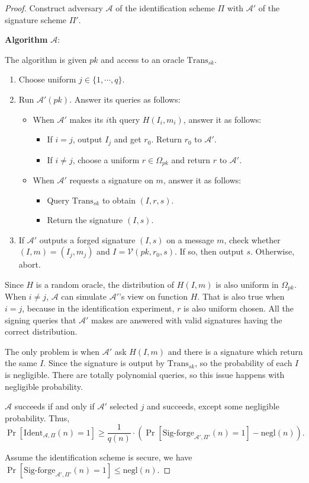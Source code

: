 \documentclass[a4paper]{article}
\newcommand{\negl}{\text{negl}}
\newcommand{\Trans}{\text{Trans}}
\newcommand{\V}{\mathcal{V}}
\newcommand{\A}{\mathcal{A}}
\newenvironment{problem}[2][Problem]{\begin{trivlist}
\item[\hskip \labelsep {\bfseries #1}\hskip \labelsep {\bfseries #2.}]}{\end{trivlist}}
\begin{document}
\begin{problem}{12.6}
\begin{proof}
Construct adversary $\A$ of the identification scheme $\Pi$ with $\A'$ of the signature scheme $\Pi'$.\par
\textbf{Algorithm} $\A$:\par
The algorithm is given $pk$ and access to an oracle $\Trans_{sk}$.
\begin{enumerate}
    \item Choose uniform $j\in\{1,\cdots,q\}$.
    \item Run $\A'(pk)$. Answer its queries as follows:
    \begin{itemize}
        \item When $\A'$ makes its $i$th query $H(I_i,m_i)$, answer it as follows:
        \begin{itemize}
            \item If $i = j$, output $I_j$ and get $r_0$. Return $r_0$ to $\A'$.
            \item If $i \ne j$, choose a uniform $r\in\Omega_{pk}$ and return $r$ to $\A'$.
        \end{itemize}
        \item When $\A'$ requests a signature on $m$, answer it as follows: \par
        \begin{itemize}
            \item Query $\Trans_{sk}$ to obtain $(I,r,s)$.
            \item Return the signature $(I,s)$.
        \end{itemize}
    \end{itemize}   
    \item If $\A'$ outputs a forged signature $(I,s)$ on a message $m$, check whether $(I,m)=(I_j,m_j)$ and $I=\V(pk,r_0,s)$. If so, then output $s$. Otherwise, abort. 
\end{enumerate}\par
Since $H$ is a random oracle, the distribution of $H(I,m)$ is also uniform in $\Omega_{pk}$. When $i\ne j$, $\A$ can simulate $\A'$'s view on function $H$. That is also true when $i=j$, because in the identification experiment, $r$ is also uniform chosen. All the signing queries that $\A'$ makes are answered with valid signatures having the correct distribution.\par
The only problem is when $\A'$ ask $H(I,m)$ and there is a signature which return the same $I$. Since the signature is output by $\Trans_{sk}$, so the probability of each $I$ is negligible. There are totally polynomial queries, so this issue happens with negligible probability.\par
$\A$ succeeds if and only if $\A'$ selected $j$ and succeeds, except some negligible probability. Thus,
$$\Pr[\text{Ident}_{\A,\Pi}(n)=1]\ge\frac{1}{q(n)}\cdot(\Pr[\text{Sig-forge}_{\A',\Pi'}(n)=1]-\negl(n)).$$\par
Assume the identification scheme is secure, we have $\Pr[\text{Sig-forge}_{\A',\Pi'}(n)=1]\le \negl(n).$
\end{proof}
\end{problem}
\end{document}

